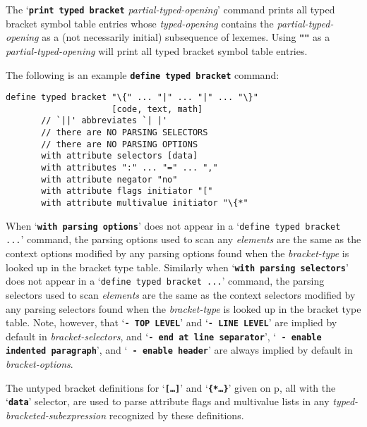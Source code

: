 \documentclass[12pt]{article}
\newcommand{\TT}[1]{{\tt \bfseries #1}}
\newcommand{\pagref}[1]{p\pageref{#1}}
\newenvironment{indpar}[1][0.3in]%
	{\begin{list}{}%
		     {\setlength{\itemsep}{0in}%
		      \setlength{\topsep}{0in}%
		      \setlength{\parsep}{1ex}%
		      \setlength{\labelwidth}{#1}%
		      \setlength{\leftmargin}{#1}%
		      \addtolength{\leftmargin}{\labelsep}}%
	 \item}%
	{\end{list}}
\begin{document}
The `\TT{print typed bracket} {\em partial-typed-opening}' command
prints all typed bracket symbol table entries whose
{\em typed-opening} contains the {\em partial-typed-opening}
as a (not necessarily initial) subsequence of lexemes.  Using \TT{""} as
a {\em partial-typed-opening} will print all typed bracket
symbol table entries.

The following is an example \TT{define typed bracket} command:
\begin{indpar}\begin{verbatim}
define typed bracket "\{" ... "|" ... "|" ... "\}"
                     [code, text, math]
       // `||' abbreviates `| |'
       // there are NO PARSING SELECTORS
       // there are NO PARSING OPTIONS
       with attribute selectors [data]
       with attributes ":" ... "=" ... ","
       with attribute negator "no"
       with attribute flags initiator "["
       with attribute multivalue initiator "\{*"
\end{verbatim}\end{indpar}

When `\TT{with parsing options}'
does not appear in a `{\tt define typed bracket ...}' command,
the parsing options used
to scan any {\em elements} are the same as the context options
modified by any parsing options
found when the {\em bracket-type} is looked up in the
bracket type table.
Similarly when
`\TT{with parsing selectors}' does not appear in a
`{\tt define typed bracket ...}' command,
the parsing selectors used to scan {\em elements}
are the same as the context selectors
modified by any parsing selectors
found when the {\em bracket-type} is looked up in the
bracket type table.
Note, however, that `\TT{- TOP LEVEL}' and `\TT{- LINE LEVEL}' are
implied by default in {\em bracket-selectors}, and
`\TT{- end at line separator}',
`\TT{ - enable indented paragraph}', and
`\TT{ - enable header}' are always implied by default in
{\em bracket-options}.

The untyped bracket definitions for `\TT{[\ldots]}' and
`\TT{\{*\ldots*\}}' given on \pagref{UNTYPED-BRACKET-BUILTINS},
all with the `\TT{data}' selector, are used to parse
attribute flags and multivalue lists in any
{\em typed-bracketed-subexpression} recognized by these definitions.
\end{document}
